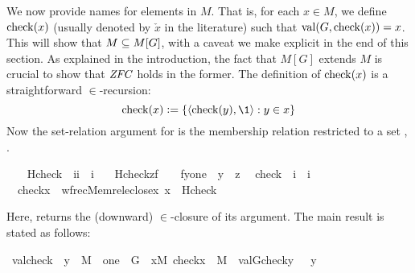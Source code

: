 
We now provide names for elements in $M$. That is, for each $x\in M$,
we define $\operatorname{check}(x)$ (usually denoted by $\check{x}$ in the literature)
such that $\operatorname{val}(G,\operatorname{check}(x))=x$. This will show that $M\subseteq M[G]$, with
a caveat we make explicit in the end of this section. As explained in
the introduction, the fact that $M[G]$ extends $M$ is crucial to show
that $\mathit{ZFC}$ holds in the former.
%
The definition of $\operatorname{check}(x)$ is a straightforward $\in$-recursion:
\begin{equation}
  \label{eq:def-check}
  \chk(x)\defi\{\lb\chk(y),\1\rb : y\in x\}
\end{equation}
Now the set-relation argument for  is the membership
relation restricted to a set , .

\begin{isabelle}
\isamarkupfalse%
\ \isanewline
\ \ Hcheck\ {\isacharcolon}{\isacharcolon}\ {\isachardoublequoteopen}{\isacharbrackleft}i{\isacharcomma}i{\isacharbrackright}\ {\isasymRightarrow}\ i{\isachardoublequoteclose}\ \isanewline
\ \ {\isachardoublequoteopen}Hcheck{\isacharparenleft}z{\isacharcomma}f{\isacharparenright}\ \ {\isacharequal}{\isacharequal}\ {\isacharbraceleft}\ {\isacharless}f{\isacharbackquote}y{\isacharcomma}one{\isachargreater}\ {\isachardot}\ y\ {\isasymin}\ z{\isacharbraceright}{\isachardoublequoteclose}\isanewline
\isanewline
{}\isamarkupfalse%
\isanewline
\ \ check\ {\isacharcolon}{\isacharcolon}\ {\isachardoublequoteopen}i\ {\isasymRightarrow}\ i{\isachardoublequoteclose}\ \isanewline
\ \ {\isachardoublequoteopen}check{\isacharparenleft}x{\isacharparenright}\ {\isacharequal}{\isacharequal}\ wfrec{\isacharparenleft}Memrel{\isacharparenleft}eclose{\isacharparenleft}{\isacharbraceleft}x{\isacharbraceright}{\isacharparenright}{\isacharparenright}{\isacharcomma}\ x\ {\isacharcomma}\ Hcheck{\isacharparenright}{\isachardoublequoteclose}
\end{isabelle}
Here,  returns the (downward) $\in$-closure of its
argument. The main result is stated as follows:

\begin{isabelle}
\isamarkupfalse%
\ valcheck\ {\isacharcolon}\ {\isachardoublequoteopen}y\ {\isasymin}\ M\ {\isasymLongrightarrow}\ one\ {\isasymin}\ G\ {\isasymLongrightarrow}\ {\isasymforall}x{\isasymin}M{\isachardot}\ check{\isacharparenleft}x{\isacharparenright}\ {\isasymin}\ M\ {\isasymLongrightarrow}\ val{\isacharparenleft}G{\isacharcomma}check{\isacharparenleft}y{\isacharparenright}{\isacharparenright}\ \ {\isacharequal}\ y{\isachardoublequoteclose}
\end{isabelle}

